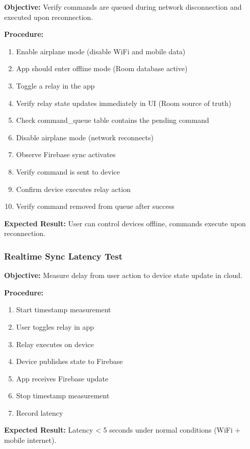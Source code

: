 \textbf{Objective:} Verify commands are queued during network disconnection and executed upon reconnection.

\textbf{Procedure:}
\begin{enumerate}
    \item Enable airplane mode (disable WiFi and mobile data)
    \item App should enter offline mode (Room database active)
    \item Toggle a relay in the app
    \item Verify relay state updates immediately in UI (Room source of truth)
    \item Check command\_queue table contains the pending command
    \item Disable airplane mode (network reconnects)
    \item Observe Firebase sync activates
    \item Verify command is sent to device
    \item Confirm device executes relay action
    \item Verify command removed from queue after success
\end{enumerate}

\textbf{Expected Result:} User can control devices offline, commands execute upon reconnection.

\subsubsection{Realtime Sync Latency Test}

\textbf{Objective:} Measure delay from user action to device state update in cloud.

\textbf{Procedure:}
\begin{enumerate}
    \item Start timestamp measurement
    \item User toggles relay in app
    \item Relay executes on device
    \item Device publishes state to Firebase
    \item App receives Firebase update
    \item Stop timestamp measurement
    \item Record latency
\end{enumerate}

\textbf{Expected Result:} Latency < 5 seconds under normal conditions (WiFi + mobile internet).

